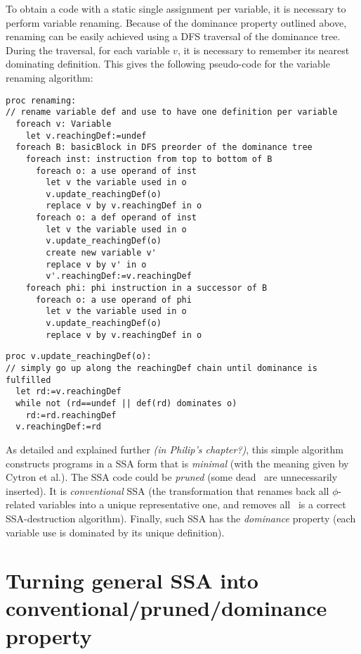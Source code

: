 {To obtain a code with a static single assignment per variable, it is necessary to perform variable renaming. Because of the dominance property outlined above,
renaming can be easily achieved using a DFS traversal of the dominance tree.
During the traversal, for each variable $v$, it is necessary to remember its nearest dominating definition.
This gives the following pseudo-code for the variable renaming algorithm:
\begin{verbatim}
proc renaming:
// rename variable def and use to have one definition per variable
  foreach v: Variable
    let v.reachingDef:=undef
  foreach B: basicBlock in DFS preorder of the dominance tree
    foreach inst: instruction from top to bottom of B
      foreach o: a use operand of inst
        let v the variable used in o
        v.update_reachingDef(o)
        replace v by v.reachingDef in o
      foreach o: a def operand of inst
        let v the variable used in o
        v.update_reachingDef(o)
        create new variable v'
        replace v by v' in o
        v'.reachingDef:=v.reachingDef
    foreach phi: phi instruction in a successor of B
      foreach o: a use operand of phi
        let v the variable used in o
        v.update_reachingDef(o)
        replace v by v.reachingDef in o
\end{verbatim}

\begin{verbatim}
proc v.update_reachingDef(o):
// simply go up along the reachingDef chain until dominance is fulfilled 
  let rd:=v.reachingDef
  while not (rd==undef || def(rd) dominates o)
    rd:=rd.reachingDef
  v.reachingDef:=rd
\end{verbatim}

As detailed and explained further \emph{(in Philip's chapter?)}, this simple algorithm constructs programs in a SSA form that is \textit{minimal} (with the meaning given by Cytron et al.).
The SSA code could be \textit{pruned} (some dead \phiops\ are unnecessarily inserted).
It is \textit{conventional} SSA (the transformation that renames back all $\phi$-related variables into a unique representative one, and removes all \phiops\ is a correct SSA-destruction algorithm).
Finally, such SSA has the \textit{dominance} property (each variable use is dominated by its unique definition).

\section{Turning general SSA into conventional/pruned/dominance property}

}
